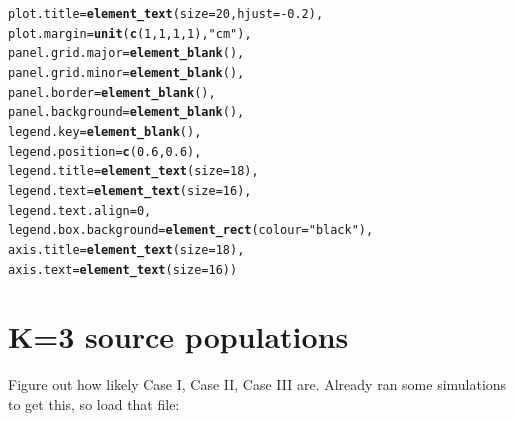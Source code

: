 \documentclass{article}\usepackage[]{graphicx}\usepackage[]{color}
\makeatletter
\newcommand{\hlnum}[1]{\textcolor[rgb]{0.686,0.059,0.569}{#1}}%
\newcommand{\hlstr}[1]{\textcolor[rgb]{0.192,0.494,0.8}{#1}}%
\newcommand{\hlopt}[1]{\textcolor[rgb]{0,0,0}{#1}}%
\newcommand{\hlstd}[1]{\textcolor[rgb]{0.345,0.345,0.345}{#1}}%
\newcommand{\hlkwc}[1]{\textcolor[rgb]{0.333,0.667,0.333}{#1}}%
\newcommand{\hlkwd}[1]{\textcolor[rgb]{0.737,0.353,0.396}{\textbf{#1}}}%
\newenvironment{kframe}{%
 \def\at@end@of@kframe{}%
 \ifinner\ifhmode%
  \def\at@end@of@kframe{\end{minipage}}%
  \begin{minipage}{\columnwidth}%
 \fi\fi%
 \def\FrameCommand##1{\hskip\@totalleftmargin \hskip-\fboxsep
 \colorbox{shadecolor}{##1}\hskip-\fboxsep
     \hskip-\linewidth \hskip-\@totalleftmargin \hskip\columnwidth}%
 \MakeFramed {\advance\hsize-\width
   \@totalleftmargin\z@ \linewidth\hsize
   \@setminipage}}%
 {\par\unskip\endMakeFramed%
 \at@end@of@kframe}
\newenvironment{knitrout}{}{} %
\makeatother
\begin{document}
\begin{knitrout}
\begin{kframe}
\begin{alltt}
        \hlkwc{plot.title} \hlstd{=} \hlkwd{element_text}\hlstd{(}\hlkwc{size} \hlstd{=} \hlnum{20}\hlstd{,} \hlkwc{hjust} \hlstd{=} \hlopt{-}\hlnum{0.2}\hlstd{),}
        \hlkwc{plot.margin}\hlstd{=}\hlkwd{unit}\hlstd{(}\hlkwd{c}\hlstd{(}\hlnum{1}\hlstd{,}\hlnum{1}\hlstd{,}\hlnum{1}\hlstd{,}\hlnum{1}\hlstd{),}\hlstr{"cm"}\hlstd{),}
        \hlkwc{panel.grid.major} \hlstd{=} \hlkwd{element_blank}\hlstd{(),}
        \hlkwc{panel.grid.minor} \hlstd{=} \hlkwd{element_blank}\hlstd{(),}
        \hlkwc{panel.border} \hlstd{=} \hlkwd{element_blank}\hlstd{(),}
        \hlkwc{panel.background} \hlstd{=} \hlkwd{element_blank}\hlstd{(),}
        \hlkwc{legend.key} \hlstd{=} \hlkwd{element_blank}\hlstd{(),}
        \hlkwc{legend.position}\hlstd{=}\hlkwd{c}\hlstd{(}\hlnum{0.6}\hlstd{,}\hlnum{0.6}\hlstd{),}
        \hlkwc{legend.title} \hlstd{=} \hlkwd{element_text}\hlstd{(}\hlkwc{size}\hlstd{=}\hlnum{18}\hlstd{),}
        \hlkwc{legend.text} \hlstd{=} \hlkwd{element_text}\hlstd{(}\hlkwc{size}\hlstd{=}\hlnum{16}\hlstd{),}
        \hlkwc{legend.text.align} \hlstd{=} \hlnum{0}\hlstd{,}
        \hlkwc{legend.box.background} \hlstd{=} \hlkwd{element_rect}\hlstd{(}\hlkwc{colour} \hlstd{=} \hlstr{"black"}\hlstd{),}
        \hlkwc{axis.title} \hlstd{=} \hlkwd{element_text}\hlstd{(}\hlkwc{size}\hlstd{=}\hlnum{18}\hlstd{),}
        \hlkwc{axis.text} \hlstd{=} \hlkwd{element_text}\hlstd{(}\hlkwc{size}\hlstd{=}\hlnum{16}\hlstd{))}
\end{alltt}
\end{kframe}
\end{knitrout}

\section{K=3 source populations}

Figure out how likely Case I, Case II, Case III are. Already ran some simulations to get this, so load that file:
\end{document}
